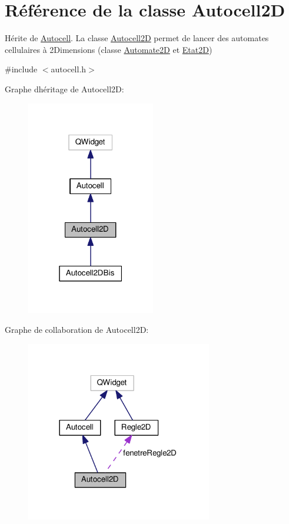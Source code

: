\hypertarget{class_autocell2_d}{}\section{Référence de la classe Autocell2D}
\label{class_autocell2_d}


Hérite de \hyperlink{class_autocell}{Autocell}. La classe \hyperlink{class_autocell2_d}{Autocell2D} permet de lancer des automates cellulaires à 2\+Dimensions (classe \hyperlink{class_automate2_d}{Automate2D} et \hyperlink{class_etat2_d}{Etat2D})  




{\ttfamily \#include $<$autocell.\+h$>$}



Graphe d\textquotesingle{}héritage de Autocell2D\+:\nopagebreak
\begin{figure}[H]
\begin{center}
\leavevmode
\includegraphics[width=159pt]{class_autocell2_d__inherit__graph}
\end{center}
\end{figure}


Graphe de collaboration de Autocell2D\+:\nopagebreak
\begin{figure}[H]
\begin{center}
\leavevmode
\includegraphics[width=230pt]{class_autocell2_d__coll__graph}
\end{center}
\end{figure}
